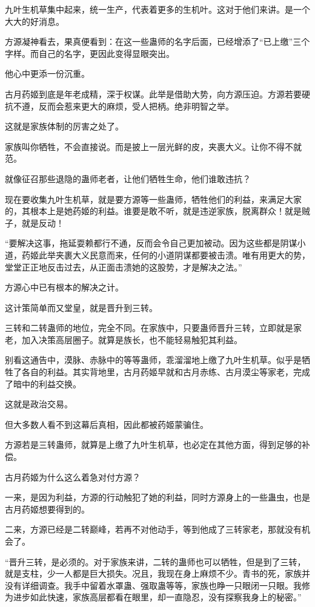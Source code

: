 \begin{this_body}
九叶生机草集中起来，统一生产，代表着更多的生机叶。这对于他们来讲。是一个大大的好消息。

方源凝神看去，果真便看到：在这一些蛊师的名字后面，已经增添了“已上缴”三个字样。而自己的名字，更因此变得显眼突出。

他心中更添一份沉重。

古月药姬到底是年老成精，深于权谋。此举是借助大势，向方源压迫。方源若要硬抗不遵，反而会惹来更大的麻烦，受人把柄。绝非明智之举。

这就是家族体制的厉害之处了。

家族叫你牺牲，不会直接说。而是披上一层光鲜的皮，夹裹大义。让你不得不就范。

就像征召那些退隐的蛊师老者，让他们牺牲生命，他们谁敢违抗？

现在要收集九叶生机草，就是要方源等一些蛊师，牺牲他们的利益，来满足大家的，其根本上是她药姬的利益。谁要是敢不听，就是违逆家族，脱离群众！就是贼子，就是反动！

“要解决这事，拖延耍赖都行不通，反而会令自己更加被动。因为这些都是阴谋小道，药姬此举夹裹大义民意而来，任何的小道阴谋都要被击溃。唯有用更大的势，堂堂正正地反击过去，从正面击溃她的这股势，才是解决之法。”

方源心中已有根本的解决之计。

这计策简单而又堂皇，就是晋升到三转。

三转和二转蛊师的地位，完全不同。在家族中，只要蛊师晋升三转，立即就是家老，加入决策高层圈子。就算是族长，也不能轻易触犯其利益。

别看这通告中，漠脉、赤脉中的等等蛊师，乖溜溜地上缴了九叶生机草。似乎是牺牲了各自的利益。其实背地里，古月药姬早就和古月赤练、古月漠尘等家老，完成了暗中的利益交换。

这就是政治交易。

但大多数人看不到这幕后真相，因此都被药姬蒙骗住。

方源若是三转蛊师，就算是上缴了九叶生机草，也必定在其他方面，得到足够的补偿。

古月药姬为什么这么着急对付方源？

一来，是因为利益，方源的行动触犯了她的利益，同时方源身上的一些蛊虫，也是古月药姬想要得到的。

二来，方源已经是二转巅峰，若再不对他动手，等到他成了三转家老，那就没有机会了。

“晋升三转，是必须的。对于家族来讲，二转的蛊师也可以牺牲，但是到了三转，就是支柱，少一人都是巨大损失。况且，我现在身上麻烦不少。青书的死，家族并没有详细调查。我手中留着水罩蛊、强取蛊等等，家族也睁一只眼闭一只眼。我修为进步如此快速，家族高层都看在眼里，却一直隐忍，没有探察我身上的秘密。”


\end{this_body}
